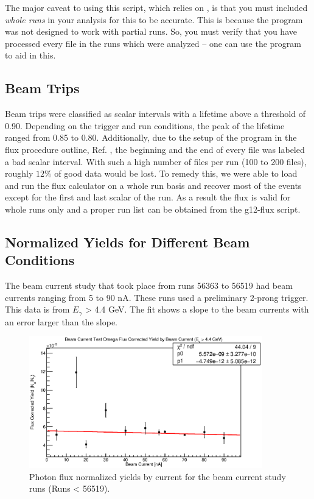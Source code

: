 The major caveat to using this script, which relies on , is that you must included \emph{whole runs} in your analysis for this to be accurate. This is because the  program was not designed to work with partial runs. So, you must verify that you have processed every file in the runs which were analyzed -- one can use the  program to aid in this.

\subsection{\label{sec:flux.trips}Beam Trips}

Beam trips were classified as scalar intervals with a lifetime above a threshold of 0.90. Depending on the trigger and run conditions, the peak of the lifetime ranged from 0.85 to 0.80. Additionally, due to the setup of the program in the flux procedure outline, Ref. \cite{clas.flux}, the beginning and the end of every file was labeled a bad scalar interval. With such a high number of files per run (100 to 200 files), roughly $12\%$ of good data would be lost. To remedy this, we were able to load and run the flux calculator on a whole run basis and recover most of the events except for the first and last scalar of the run. As a result the flux is valid for whole runs only and a proper run list can be obtained from the g12-flux script.

\FloatBarrier


\subsection{\label{sec:flux.normyields}Normalized Yields for Different Beam Conditions}
The beam current study that took place from runs 56363 to 56519 had beam currents ranging from 5 to 90 nA. These runs used a preliminary 2-prong trigger. This data is from $E_{\gamma}$ > 4.4 GeV. The fit shows a slope to the beam currents with an error larger than the slope.

\begin{figure}[h]
\begin{center}
 \includegraphics[width=0.9\textwidth]{figures/gflux/gflux_bycurrent_omega.eps}
  \caption{Photon flux normalized yields by current for the beam current study runs (Runs < 56519).}
  \label{gfluxbycurrent}
  \end{center}
\end{figure}
\FloatBarrier



